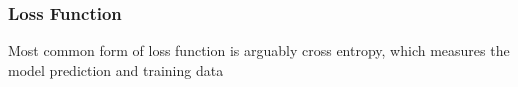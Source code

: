 \subsubsection{Loss Function}

Most common form of loss function is arguably cross entropy, which measures the model prediction and training data